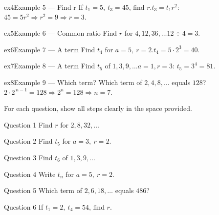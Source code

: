 \documentclass[11pt]{article}
\begin{document}
\begin{example}{ex4}{Example 5 --- Find r}
If $t_1=5,\ t_3=45$, find $r$.\soln $t_3=t_1 r^2$: $45=5r^2\Rightarrow r^2=9\Rightarrow r=3$.
\end{example}

\begin{example}{ex5}{Example 6 --- Common ratio}
Find $r$ for $4,12,36,\dots$\soln $12\div4=3$.
\end{example}

\begin{example}{ex6}{Example 7 --- A term}
Find $t_4$ for $a=5,\ r=2$.\soln $t_4=5\cdot2^{3}=40$.
\end{example}

\begin{example}{ex7}{Example 8 --- A term}
Find $t_5$ of $1,3,9,\dots$\soln $a=1,r=3$: $t_5=3^{4}=81$.
\end{example}

\begin{example}{ex8}{Example 9 --- Which term?}
Which term of $2,4,8,\dots$ equals $128$?\soln $2\cdot2^{\,n-1}=128\Rightarrow 2^{n}=128\Rightarrow n=7$.
\end{example}

\clearpage
{}
For each question, show all steps clearly in the space provided.

\begin{qbox}{Question 1}
Find $r$ for $2,8,32,\dots$\workspace{2.4cm}
\end{qbox}

\begin{qbox}{Question 2}
Find $t_5$ for $a=3,\ r=2$.\workspace{2.4cm}
\end{qbox}

\begin{qbox}{Question 3}
Find $t_6$ of $1,3,9,\dots$\workspace{2.4cm}
\end{qbox}

\begin{qbox}{Question 4}
Write $t_n$ for $a=5,\ r=2$.\workspace{2.4cm}
\end{qbox}

\begin{qbox}{Question 5}
Which term of $2,6,18,\dots$ equals $486$?\workspace{2.4cm}
\end{qbox}

\begin{qbox}{Question 6}
If $t_1=2,\ t_4=54$, find $r$.\workspace{2.4cm}
\end{qbox}
\end{document}
